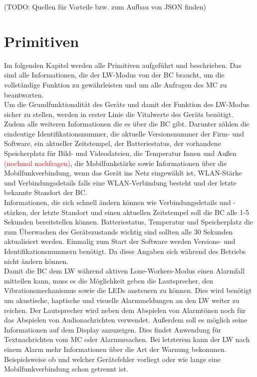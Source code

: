 \documentclass[thesis.tex]{subfiles}
\begin{document}
(TODO: Quellen für Vorteile bzw. zum Aufbau von JSON finden)

\section{Primitiven}\label{chap:primitiven}
Im folgenden Kapitel werden alle Primitiven aufgeführt und beschrieben.
Das sind alle Informationen, die der LW-Modus von der BC braucht, um die vollständige Funktion zu gewährleisten
und um alle Anfragen des MC zu beantworten.
\\

Um die Grundfunktionalität des Geräts und damit der Funktion des LW-Modus sicher zu stellen, werden in erster Linie
die Vitalwerte des Geräts benötigt.
Zudem alle weiteren Informationen die es über die BC gibt.
Darunter zählen die eindeutige Identifikationsnummer, die aktuelle Versionsnummer der Firm- und Software,
ein aktueller Zeitstempel, der Batteriestatus, der vorhandene Speicherplatz für Bild- und Videodateien,
die Temperatur Innen und Außen \textcolor{red}{(nochmal nachfragen)}, die Mobilfunkstärke sowie Informationen über die Mobilfunkverbindung,
wenn das Gerät ins Netz eingewählt ist, WLAN-Stärke und Verbindungsdetails falls eine WLAN-Verbindung besteht und
der letzte bekannte Standort der BC.
\\

Informationen, die sich schnell ändern können wie Verbindungsdetails und -stärken, der letzte Standort und
einen aktuellen Zeitstempel soll die BC alle 1-5 Sekunden bereitstellen können.
Batteriestatus, Temperatur und Speicherplatz die zum Überwachen des Gerätezustands wichtig sind sollten alle 30 Sekunden aktualisiert werden.
Einmalig zum Start der Software werden Versions- und Identifikationsnummern benötigt.
Da diese Angaben sich während des Betriebs nicht ändern können.
\\

Damit die BC dem LW während aktiven Lone-Workers-Modus einen Alarmfall mitteilen kann,
muss es die Möglichkeit geben die Lautsprecher, den Vibrationsmechanismus sowie die LEDs ansteuern zu können.
Dies wird benötigt um akustische, haptische und visuelle Alarmmeldungen an den LW weiter zu reichen.
Der Lautsprecher wird neben dem Abspielen von Alarmtönen noch für das Abspielen von Audionachrichten verwendet.
Außerdem soll es möglich seine Informationen auf dem Display anzuzeigen.
Dies findet Anwendung für Textnachrichten vom MC oder Alarmursachen.
Bei letzterem kann der LW nach einem Alarm mehr Informationen über die Art der Warnung bekommen.
Beispielsweise ob und welcher Gerätefehler vorliegt oder wie lange eine Mobilfunkverbindung schon getrennt ist.
\\
\end{document}
